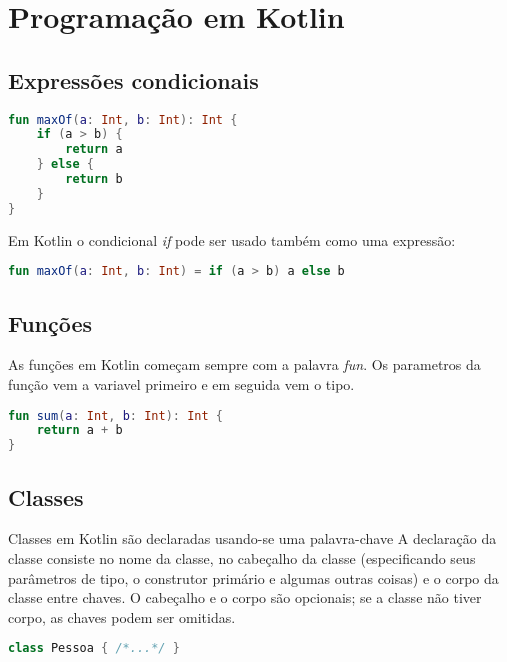 

\chapter{ Programa\c{c}\~{a}o em Kotlin}


\section{Expressões condicionais}

\begin{lstlisting}[label={lst:example1}, language=Kotlin]
  fun maxOf(a: Int, b: Int): Int {
    if (a > b) {
        return a
    } else {
        return b
    }
}
  \end{lstlisting}
  Em Kotlin o condicional \emph{if} pode ser usado também como uma expressão:

  \begin{lstlisting}[label={lst:example1}, language=Kotlin]
    fun maxOf(a: Int, b: Int) = if (a > b) a else b
  \end{lstlisting}


\section{Funções}
As funções em Kotlin começam sempre com a palavra \emph{fun}. Os
parametros da função vem a variavel primeiro e em seguida vem o tipo. 
\begin{lstlisting}[label={lst:example1}, language=Kotlin]
  fun sum(a: Int, b: Int): Int {
    return a + b
}
  \end{lstlisting}


\section{Classes}
Classes em Kotlin são declaradas usando-se uma palavra-chave
A declaração da classe consiste no nome da classe, no cabeçalho da
classe (especificando seus parâmetros de tipo, o construtor
primário e algumas outras coisas) e o corpo da classe entre
chaves. O cabeçalho e o corpo são opcionais; se a classe não tiver corpo, as chaves podem ser omitidas.
\begin{lstlisting}[label={lst:example1}, language=Kotlin]
      class Pessoa { /*...*/ }
      \end{lstlisting}


